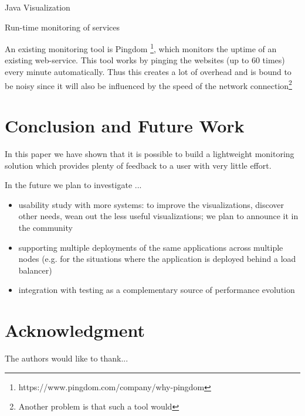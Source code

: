 \documentclass[conference]{IEEEtran}
\begin{document}

Java Visualization \cite{Pauw02a}

Run-time monitoring of services \cite{ghezzi2007run}

An existing monitoring tool is Pingdom \footnote{https://www.pingdom.com/company/why-pingdom}, which monitors the uptime of an existing web-service. This tool works by pinging the websites (up to 60 times) every minute automatically. Thus this creates a lot of overhead and is bound to be noisy since it will also be influenced by the speed of the network connection\footnote{Another problem is that such a tool would }



\section{Conclusion and Future Work}

In this paper we have shown that it is possible to build a lightweight monitoring solution which provides plenty of feedback to a user with very little effort. 

In the future we plan to investigate ...

\begin{itemize}
  \item usability study with more systems: to improve the visualizations, discover other needs, wean out the less useful visualizations; we plan to announce it in the community 
  \item supporting multiple deployments of the same applications across multiple nodes (e.g. for the situations where the application is deployed behind a load balancer)
  \item integration with testing as a complementary source of performance evolution

\end{itemize}





\section*{Acknowledgment}


The authors would like to thank...










\end{document}

